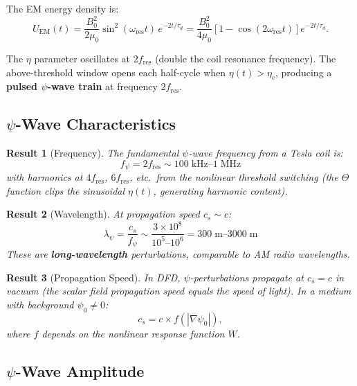 \documentclass[11pt,a4paper]{article}
\newtheorem{result}{Result}
\begin{document}
The EM energy density is:
\begin{equation}
U_{\mathrm{EM}}(t) = \frac{B_0^2}{2\mu_0}\sin^2(\omega_{\mathrm{res}} t)\,e^{-2t/\tau_d}
= \frac{B_0^2}{4\mu_0}\left[1 - \cos(2\omega_{\mathrm{res}} t)\right]e^{-2t/\tau_d}.
\end{equation}

The $\eta$ parameter oscillates at $2f_{\mathrm{res}}$ (double the coil resonance frequency).
The above-threshold window opens each half-cycle when $\eta(t) > \eta_c$, producing
a \textbf{pulsed $\psi$-wave train} at frequency $2f_{\mathrm{res}}$.

\subsection{$\psi$-Wave Characteristics}

\begin{result}[Frequency]
The fundamental $\psi$-wave frequency from a Tesla coil is:
\begin{equation}
\boxed{f_\psi = 2 f_{\mathrm{res}} \sim 100\;\mathrm{kHz}\text{--}1\;\mathrm{MHz}}
\end{equation}
with harmonics at $4f_{\mathrm{res}}$, $6f_{\mathrm{res}}$, etc.\ from the nonlinear
threshold switching (the $\Theta$ function clips the sinusoidal $\eta(t)$, generating
harmonic content).
\end{result}

\begin{result}[Wavelength]
At propagation speed $c_s \sim c$:
\begin{equation}
\boxed{\lambda_\psi = \frac{c_s}{f_\psi} \sim \frac{3 \times 10^8}{10^5\text{--}10^6}
= 300\;\mathrm{m}\text{--}3000\;\mathrm{m}}
\end{equation}
These are \textbf{long-wavelength} perturbations, comparable to AM radio wavelengths.
\end{result}

\begin{result}[Propagation Speed]
In DFD, $\psi$-perturbations propagate at $c_s = c$ in vacuum (the scalar field
propagation speed equals the speed of light). In a medium with background $\psi_0 \neq 0$:
\begin{equation}
c_s = c \times f(|\nabla\psi_0|),
\end{equation}
where $f$ depends on the nonlinear response function $W$.
\end{result}

\subsection{$\psi$-Wave Amplitude}
\end{document}

